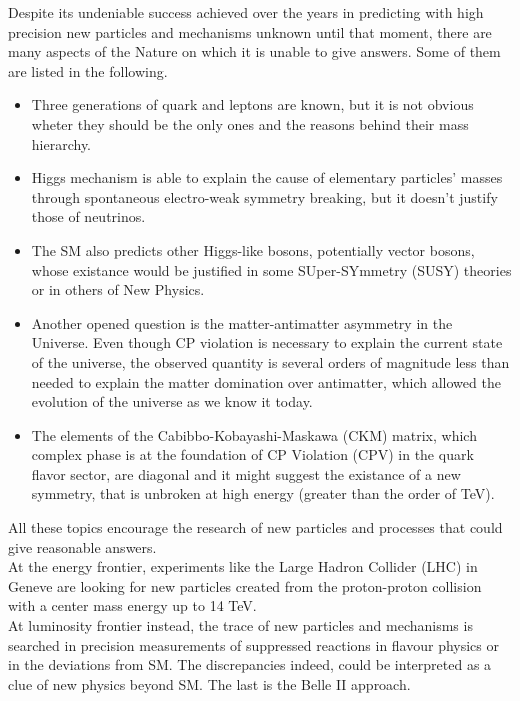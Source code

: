 Despite its undeniable success achieved over the years in predicting with high precision new particles and mechanisms unknown until that moment, there are many aspects of the Nature on which it is unable to give answers. Some of them are listed in the following.

\begin{itemize}
\item Three generations of quark and leptons are known, but it is not obvious wheter they should be the only ones and the reasons behind their mass hierarchy.
\item Higgs mechanism is able to explain the cause of elementary particles' masses through spontaneous electro-weak symmetry breaking, but it doesn't justify those of neutrinos.
\item The SM also predicts other Higgs-like bosons, potentially vector bosons, whose existance would be justified in some SUper-SYmmetry (SUSY) theories or in others of New Physics.
\item Another opened question is the matter-antimatter asymmetry in the Universe. Even though CP violation is necessary to explain the current state of the universe, the observed quantity is several orders of magnitude less than needed to explain the matter domination over antimatter, which allowed the evolution of the universe as we know it today.
\item The elements of the Cabibbo-Kobayashi-Maskawa (CKM) matrix, which complex phase is at the foundation of CP Violation (CPV) in the quark flavor sector, are diagonal and it might suggest the existance of a new symmetry, that is unbroken at high energy (greater than the order of TeV).
\end{itemize}

All these topics encourage the research of new particles and processes that could give reasonable answers.\\
At the energy frontier, experiments like the Large Hadron Collider (LHC) in Geneve are looking for new particles created from the proton-proton collision with a center mass energy up to 14 TeV.\\
At luminosity frontier instead, the trace of new particles and mechanisms is searched in precision measurements of suppressed reactions in flavour physics or in the deviations from SM. The discrepancies indeed, could be interpreted as a clue of new physics beyond SM. The last is the Belle II approach.\\




